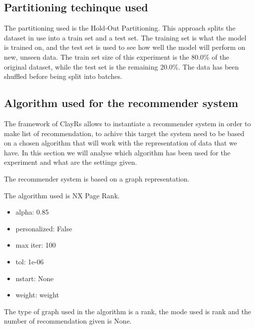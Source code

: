 \documentclass[11pt]{article}
\begin{document}
\subsection{Partitioning techinque used}\label{subsec:partitioning}


The partitioning used is the Hold-Out Partitioning.
This approach splits the dataset in use into a train set and a test set.
The training set is what the model is trained on, and the test set is used to see how
well the model will perform on new, unseen data.
\hfill\break
\hfill\break
The train set size of this experiment is the 80.0\%
of the original dataset, while the test set is the remaining 20.0\%.
\hfill\break
\hfill\break
    The data has been shuffled before being split into batches.
\hfill\break
\hfill\break


\subsection{Algorithm used for the recommender system}\label{subsec:algo}
The framework of ClayRs allows to instantiate a recommender system in order to make list of recommendation, to achive
this target the system need to be based on a chosen algorithm that will work with the representation of data that
we have.
In this section we will analyse which algorithm has been used for the experiment and what are the settings
given.
\hfill\break
\hfill\break

The recommender system is based on a graph representation.
\hfill\break
\hfill\break











The algorithm used is NX Page Rank.
\begin{itemize}
    \item alpha: 0.85
    \item personalized: False
    \item max iter: 100
    \item tol: 1e-06
    \item nstart: None
    \item weight: weight
\end{itemize}
\hfill\break
\hfill\break
The type of graph used in the algorithm is a rank,
the mode used is rank and the number of recommendation given is
None.
\hfill\break
\hfill\break
\end{document}

